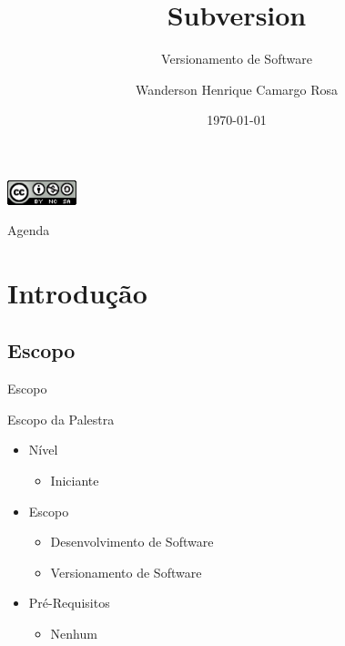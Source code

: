 \documentclass[hyperref={pdfpagelabels=false}]{beamer}
\title[SVN]{Subversion}
\subtitle[Versionamento]{Versionamento de Software}
\author[CAMARGO]{Wanderson Henrique Camargo Rosa}
\institute[UNISINOS]{Universidade do Vale do Rio dos Sinos --- UNISINOS}
\date{\today{}}
\begin{document}
\begin{frame}
    \maketitle{}
    \begin{center}
        \includegraphics[width=20mm]{src/CC-BY-NC-SA-icon-88x31.png}
    \end{center}
\end{frame}

\begin{frame}{Agenda}
    \tableofcontents{}
\end{frame}

\section{Introdução}
\label{sec:introducao}

\subsection{Escopo}

\begin{frame}{Escopo}
    \begin{block}{Escopo da Palestra}
        \begin{itemize}
            \item Nível
            \begin{itemize}
                \item Iniciante
            \end{itemize}
            \item Escopo
            \begin{itemize}
                \item Desenvolvimento de Software
                \item Versionamento de Software
            \end{itemize}
            \item Pré-Requisitos
            \begin{itemize}
                \item Nenhum
            \end{itemize}
        \end{itemize}
    \end{block}
\end{frame}
\end{document}
